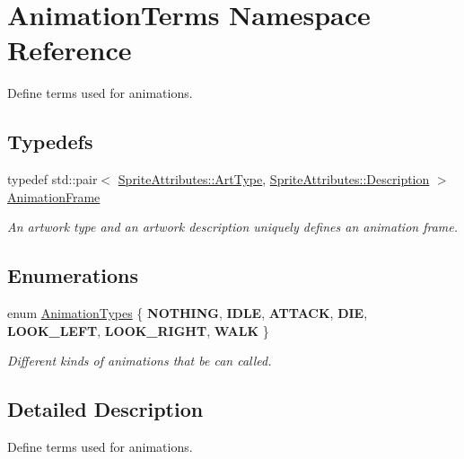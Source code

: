 \hypertarget{namespace_animation_terms}{}\section{Animation\+Terms Namespace Reference}
\label{namespace_animation_terms}


Define terms used for animations.  


\subsection*{Typedefs}
\begin{DoxyCompactItemize}
\item 
\mbox{\label{namespace_animation_terms_a9ad8fa379228f750219207c3c9f618e5}} 
typedef std\+::pair$<$ \mbox{\hyperlink{namespace_sprite_attributes_afb5447c311bc29f0ce8ddfd025c6e998}{Sprite\+Attributes\+::\+Art\+Type}}, \mbox{\hyperlink{namespace_sprite_attributes_a3ece96d6288b14d53d84e2138392395c}{Sprite\+Attributes\+::\+Description}} $>$ \mbox{\hyperlink{namespace_animation_terms_a9ad8fa379228f750219207c3c9f618e5}{Animation\+Frame}}
\begin{DoxyCompactList}\small\item\em An artwork type and an artwork description uniquely defines an animation frame. \end{DoxyCompactList}\end{DoxyCompactItemize}
\subsection*{Enumerations}
\begin{DoxyCompactItemize}
\item 
\mbox{\label{namespace_animation_terms_a171348588b2b248e71955ad7c5042e67}} 
enum \mbox{\hyperlink{namespace_animation_terms_a171348588b2b248e71955ad7c5042e67}{Animation\+Types}} \{ \newline
{\bfseries N\+O\+T\+H\+I\+NG}, 
{\bfseries I\+D\+LE}, 
{\bfseries A\+T\+T\+A\+CK}, 
{\bfseries D\+IE}, 
\newline
{\bfseries L\+O\+O\+K\+\_\+\+L\+E\+FT}, 
{\bfseries L\+O\+O\+K\+\_\+\+R\+I\+G\+HT}, 
{\bfseries W\+A\+LK}
 \}
\begin{DoxyCompactList}\small\item\em Different kinds of animations that be can called. \end{DoxyCompactList}\end{DoxyCompactItemize}


\subsection{Detailed Description}
Define terms used for animations. 